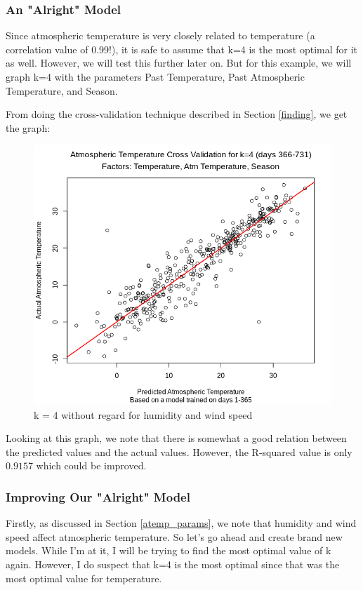 \documentclass[12pt]{article}
\begin{document}
\subsubsection{An "Alright" Model}
Since atmospheric temperature is very closely related to temperature (a correlation value of 0.99!), it is safe to assume that k=4 is the most optimal for it as well. However, we will test this further later on. But for this example, we will graph k=4 with the parameters Past Temperature, Past Atmospheric Temperature, and Season.

From doing the cross-validation technique described in Section \ref{finding}, we get the graph:

\begin{figure}[H]
	\centering
  	\includegraphics[width=130mm]{badatempxvalidk=4.png}
 	\caption{k = 4 without regard for humidity and wind speed}
 	\label{fig:badmodel}
\end{figure}

Looking at this graph, we note that there is somewhat a good relation between the predicted values and the actual values. However, the R-squared value is only $0.9157$ which could be improved.

\subsubsection{Improving Our "Alright" Model}
Firstly, as discussed in Section \ref{atemp_params}, we note that humidity and wind speed affect atmospheric temperature. So let's go ahead and create brand new models. While I'm at it, I will be trying to find the most optimal value of k again. However, I do suspect that k=4 is the most optimal since that was the most optimal value for temperature.
\end{document}
